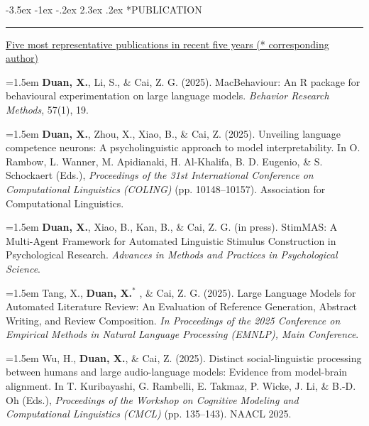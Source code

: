 \documentclass[12pt,a4paper]{article}
\makeatletter
\renewcommand{\section}{\@startsection{section}{1}{\z@}%
  {-3.5ex \@plus -1ex \@minus -.2ex}%
  {2.3ex \@plus.2ex}%
  {\normalfont\normalsize\bfseries}}
\makeatother
\begin{document}
\vspace{\baselineskip}
\vspace{-2em} 
\section*{PUBLICATION}
\vspace{-0.5em}
\hrule
\vspace{.2em}

\underline{Five most representative publications in recent five years (* corresponding author)}
\vspace{1em}

\hangindent=1.5em  \textbf{Duan, X.}, Li, S., \& Cai, Z. G. (2025). MacBehaviour: An R package for behavioural experimentation on large language models. \textit{Behavior Research Methods}, 57(1), 19. 

\hangindent=1.5em  \textbf{Duan, X.}, Zhou, X., Xiao, B., \& Cai, Z. (2025). Unveiling language competence neurons: A psycholinguistic approach to model interpretability. In O. Rambow, L. Wanner, M. Apidianaki, H. Al-Khalifa, B. D. Eugenio, \& S. Schockaert (Eds.), \textit{Proceedings of the 31st International Conference on Computational Linguistics (COLING)} (pp. 10148–10157). Association for Computational Linguistics.

\hangindent=1.5em  \textbf{Duan, X.}, Xiao, B., Kan, B., \& Cai, Z. G. (in press). StimMAS: A Multi-Agent Framework for Automated Linguistic Stimulus Construction in Psychological Research. \textit{Advances in Methods and Practices in Psychological Science}. 

\hangindent=1.5em  Tang, X., \textbf{Duan, X.}$^{*}$ , \& Cai, Z. G. (2025). Large Language Models for Automated Literature Review: An Evaluation of Reference Generation, Abstract Writing, and Review Composition. \textit{In Proceedings of the 2025 Conference on Empirical Methods in Natural Language Processing (EMNLP), Main Conference}. 


\hangindent=1.5em  Wu, H., \textbf{Duan, X.}, \& Cai, Z. (2025). Distinct social-linguistic processing between humans and large audio-language models: Evidence from model-brain alignment. In T. Kuribayashi, G. Rambelli, E. Takmaz, P. Wicke, J. Li, \& B.-D. Oh (Eds.), \textit{Proceedings of the Workshop on Cognitive Modeling and Computational Linguistics (CMCL)} (pp. 135–143). NAACL 2025. 
\end{document}
